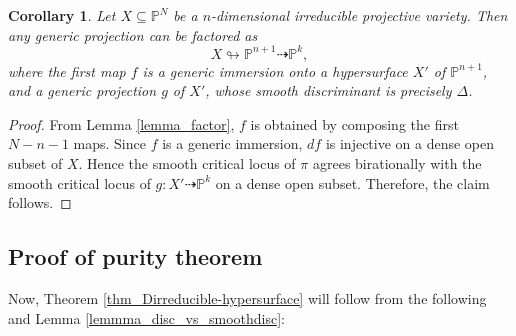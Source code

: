 \documentclass[12pt]{amsart}
\newtheorem{corollary}[theorem]{Corollary}
\begin{document}
\begin{corollary} \label{cor_factor2}
Let $X\subseteq \mathbb P^N$ be a $n$-dimensional irreducible projective variety. Then any generic projection can be factored as 
$$X\looparrowright \mathbb P^{n+1}\dashrightarrow \mathbb P^k,$$
where the first map $f$ is a generic immersion  onto a hypersurface $X'$ of $\mathbb P^{n+1}$, and a generic projection $g$ of $X'$, whose smooth discriminant is precisely $\Delta$. 
\end{corollary}
\begin{proof} From Lemma \ref{lemma_factor}, $f$ is obtained by composing the first $N-n-1$ maps. Since $f$ is a generic immersion, $df$ is injective on a dense open subset of $X$. Hence the smooth critical locus of $\pi$ agrees birationally with the smooth critical locus of $g:X'\dashrightarrow \mathbb P^k$ on a dense open subset.   Therefore, the claim follows.
\end{proof}



\subsection{Proof of purity theorem}


Now, Theorem \ref{thm_Dirreducible-hypersurface} will follow from the following and Lemma \ref{lemmma_disc_vs_smoothdisc}:
\end{document}
